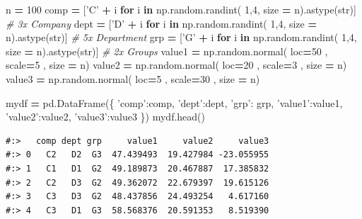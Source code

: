 \documentclass[
]{book}
\newenvironment{Shaded}{\begin{snugshade}}{\end{snugshade}}
\newcommand{\BuiltInTok}[1]{#1}
\newcommand{\CommentTok}[1]{\textcolor[rgb]{0.37,0.37,0.37}{\textit{#1}}}
\newcommand{\ControlFlowTok}[1]{\textcolor[rgb]{0.27,0.27,0.27}{\textbf{#1}}}
\newcommand{\DecValTok}[1]{\textcolor[rgb]{0.06,0.06,0.06}{#1}}
\newcommand{\KeywordTok}[1]{\textcolor[rgb]{0.27,0.27,0.27}{\textbf{#1}}}
\newcommand{\NormalTok}[1]{#1}
\newcommand{\OperatorTok}[1]{\textcolor[rgb]{0.43,0.43,0.43}{\textbf{#1}}}
\newcommand{\StringTok}[1]{\textcolor[rgb]{0.5,0.5,0.5}{#1}}
\begin{document}
\begin{Shaded}
\begin{Highlighting}[]
\NormalTok{n }\OperatorTok{=} \DecValTok{100}
\NormalTok{comp }\OperatorTok{=}\NormalTok{ [}\StringTok{'C'} \OperatorTok{+}\NormalTok{ i }\ControlFlowTok{for}\NormalTok{ i }\KeywordTok{in}\NormalTok{ np.random.randint( }\DecValTok{1}\NormalTok{,}\DecValTok{4}\NormalTok{, size  }\OperatorTok{=}\NormalTok{ n).astype(}\BuiltInTok{str}\NormalTok{)] }\CommentTok{# 3x Company}
\NormalTok{dept }\OperatorTok{=}\NormalTok{ [}\StringTok{'D'} \OperatorTok{+}\NormalTok{ i }\ControlFlowTok{for}\NormalTok{ i }\KeywordTok{in}\NormalTok{ np.random.randint( }\DecValTok{1}\NormalTok{,}\DecValTok{4}\NormalTok{, size  }\OperatorTok{=}\NormalTok{ n).astype(}\BuiltInTok{str}\NormalTok{)] }\CommentTok{# 5x Department}
\NormalTok{grp }\OperatorTok{=}\NormalTok{  [}\StringTok{'G'} \OperatorTok{+}\NormalTok{ i }\ControlFlowTok{for}\NormalTok{ i }\KeywordTok{in}\NormalTok{ np.random.randint( }\DecValTok{1}\NormalTok{,}\DecValTok{4}\NormalTok{, size  }\OperatorTok{=}\NormalTok{ n).astype(}\BuiltInTok{str}\NormalTok{)] }\CommentTok{# 2x Groups}
\NormalTok{value1 }\OperatorTok{=}\NormalTok{ np.random.normal( loc}\OperatorTok{=}\DecValTok{50}\NormalTok{ , scale}\OperatorTok{=}\DecValTok{5}\NormalTok{ , size }\OperatorTok{=}\NormalTok{ n)}
\NormalTok{value2 }\OperatorTok{=}\NormalTok{ np.random.normal( loc}\OperatorTok{=}\DecValTok{20}\NormalTok{ , scale}\OperatorTok{=}\DecValTok{3}\NormalTok{ , size }\OperatorTok{=}\NormalTok{ n)}
\NormalTok{value3 }\OperatorTok{=}\NormalTok{ np.random.normal( loc}\OperatorTok{=}\DecValTok{5}\NormalTok{ , scale}\OperatorTok{=}\DecValTok{30}\NormalTok{ , size }\OperatorTok{=}\NormalTok{ n)}

\NormalTok{mydf }\OperatorTok{=}\NormalTok{ pd.DataFrame(\{}
    \StringTok{'comp'}\NormalTok{:comp, }
    \StringTok{'dept'}\NormalTok{:dept, }
    \StringTok{'grp'}\NormalTok{: grp,}
    \StringTok{'value1'}\NormalTok{:value1, }
    \StringTok{'value2'}\NormalTok{:value2,}
    \StringTok{'value3'}\NormalTok{:value3 }
\NormalTok{\})}
\NormalTok{mydf.head()}
\end{Highlighting}
\end{Shaded}

\begin{verbatim}
#:>   comp dept grp     value1     value2     value3
#:> 0   C2   D2  G3  47.439493  19.427984 -23.055955
#:> 1   C1   D1  G2  49.189873  20.467887  17.385832
#:> 2   C2   D3  G2  49.362072  22.679397  19.615126
#:> 3   C3   D3  G2  48.437856  24.493254   4.617160
#:> 4   C3   D1  G3  58.568376  20.591353   8.519390
\end{verbatim}
\end{document}
